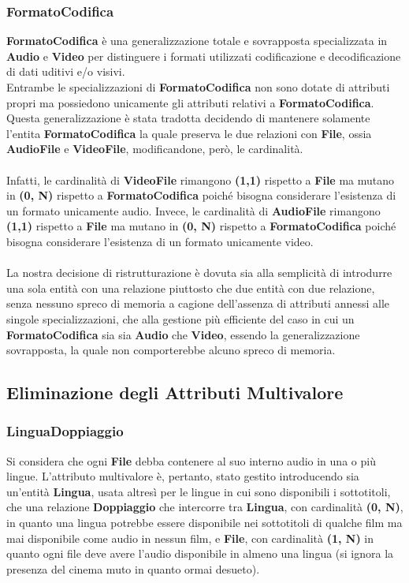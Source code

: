 \documentclass{article}
\begin{document}
\subsubsection{FormatoCodifica}
\textbf{FormatoCodifica} è una generalizzazione totale e sovrapposta specializzata in \textbf{Audio} e \textbf{Video} per distinguere i formati utilizzati codificazione e decodificazione di dati uditivi e/o visivi. 
\\ 
Entrambe le specializzazioni di \textbf{FormatoCodifica} non sono dotate di attributi propri ma possiedono unicamente gli attributi relativi a \textbf{FormatoCodifica}. 
\\ 
%
%
%
%
%
%
%
%
Questa generalizzazione è stata tradotta decidendo di mantenere solamente l'entita \textbf{FormatoCodifica} la quale preserva le due relazioni con \textbf{File}, ossia \textbf{AudioFile} e \textbf{VideoFile}, modificandone, però, le cardinalità. 
\\ \\ 
Infatti, le cardinalità di \textbf{VideoFile} rimangono \textbf{(1,1)} rispetto a \textbf{File} ma mutano in \textbf{(0, N)} rispetto a \textbf{FormatoCodifica} poiché bisogna considerare l'esistenza di un formato unicamente audio. Invece, le cardinalità di \textbf{AudioFile} rimangono \textbf{(1,1)} rispetto a \textbf{File} ma mutano in \textbf{(0, N)} rispetto a \textbf{FormatoCodifica} poiché bisogna considerare l'esistenza di un formato unicamente video.
\\ \\ 
La nostra decisione di ristrutturazione è dovuta sia alla semplicità di introdurre una sola entità con una relazione piuttosto che due entità con due relazione, senza nessuno spreco di memoria a cagione dell'assenza di attributi annessi alle singole specializzazioni, che alla gestione più efficiente del caso in cui un \textbf{FormatoCodifica} sia sia \textbf{Audio} che \textbf{Video}, essendo la generalizzazione sovrapposta, la quale non comporterebbe alcuno spreco di memoria.
\newpage
%
%
%
%
%
%
%
%
\subsection{Eliminazione degli Attributi Multivalore}
\subsubsection{LinguaDoppiaggio}
Si considera che ogni \textbf{File} debba contenere al suo interno audio in una o più lingue. L'attributo multivalore è, pertanto, stato gestito introducendo sia un'entità \textbf{Lingua}, usata altresì per le lingue in cui sono disponibili i sottotitoli, che una relazione \textbf{Doppiaggio} che intercorre tra \textbf{Lingua}, con cardinalità \textbf{(0, N)}, in quanto una lingua potrebbe essere disponibile nei sottotitoli di qualche film ma mai disponibile come audio in nessun film, e \textbf{File}, con cardinalità \textbf{(1, N)} in quanto ogni file deve avere l'audio disponibile in almeno una lingua (si ignora la presenza del cinema muto in quanto ormai desueto).
\end{document}
